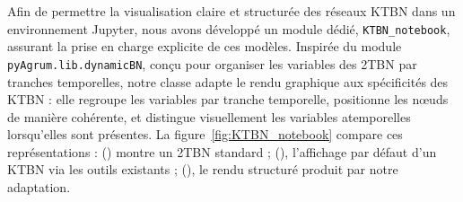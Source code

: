 \documentclass{article}
\begin{document}
Afin de permettre la visualisation claire et structurée des réseaux KTBN dans un environnement Jupyter, nous avons
développé un module dédié, \texttt{KTBN\_notebook}, assurant la prise en charge explicite de ces modèles.
Inspirée du module \texttt{pyAgrum.lib.dynamicBN}, conçu pour organiser les variables des 2TBN par tranches temporelles,
notre classe adapte le rendu graphique aux spécificités des KTBN : elle regroupe les variables par tranche temporelle,
positionne les nœuds de manière cohérente, et distingue visuellement les variables atemporelles lorsqu'elles sont
présentes. La figure~\ref{fig:KTBN_notebook} compare ces représentations : () montre un 2TBN
standard ; (), l'affichage par défaut d'un KTBN via les outils existants ;
(), le rendu structuré produit par notre adaptation.
\end{document}
